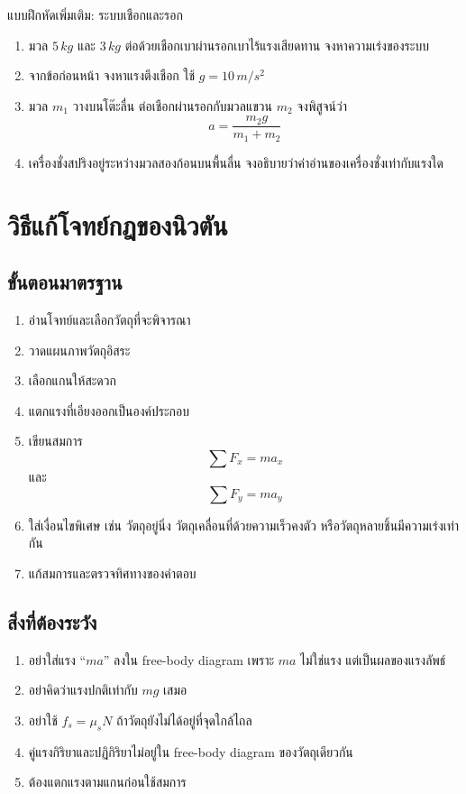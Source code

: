 \begin{exercisebox}{แบบฝึกหัดเพิ่มเติม: ระบบเชือกและรอก}
\begin{enumerate}
    \item มวล $5\,\si{kg}$ และ $3\,\si{kg}$ ต่อด้วยเชือกเบาผ่านรอกเบาไร้แรงเสียดทาน จงหาความเร่งของระบบ
    \item จากข้อก่อนหน้า จงหาแรงตึงเชือก ใช้ $g=10\,\si{m/s^2}$
    \item มวล $m_1$ วางบนโต๊ะลื่น ต่อเชือกผ่านรอกกับมวลแขวน $m_2$ จงพิสูจน์ว่า
    \[
    a=\frac{m_2g}{m_1+m_2}
    \]
    \item เครื่องชั่งสปริงอยู่ระหว่างมวลสองก้อนบนพื้นลื่น จงอธิบายว่าค่าอ่านของเครื่องชั่งเท่ากับแรงใด
\end{enumerate}
\end{exercisebox}

\section{วิธีแก้โจทย์กฎของนิวตัน}

\subsection{ขั้นตอนมาตรฐาน}

\begin{tcolorbox}[title=ขั้นตอนแก้โจทย์กฎของนิวตัน]
\begin{enumerate}
    \item อ่านโจทย์และเลือกวัตถุที่จะพิจารณา
    \item วาดแผนภาพวัตถุอิสระ
    \item เลือกแกนให้สะดวก
    \item แตกแรงที่เอียงออกเป็นองค์ประกอบ
    \item เขียนสมการ
    \[
    \sum F_x=ma_x
    \]
    และ
    \[
    \sum F_y=ma_y
    \]
    \item ใส่เงื่อนไขพิเศษ เช่น วัตถุอยู่นิ่ง วัตถุเคลื่อนที่ด้วยความเร็วคงตัว หรือวัตถุหลายชิ้นมีความเร่งเท่ากัน
    \item แก้สมการและตรวจทิศทางของคำตอบ
\end{enumerate}
\end{tcolorbox}

\subsection{สิ่งที่ต้องระวัง}

\begin{enumerate}
    \item อย่าใส่แรง ``$ma$'' ลงใน free-body diagram เพราะ $ma$ ไม่ใช่แรง แต่เป็นผลของแรงลัพธ์
    \item อย่าคิดว่าแรงปกติเท่ากับ $mg$ เสมอ
    \item อย่าใช้ $f_s=\mu_sN$ ถ้าวัตถุยังไม่ได้อยู่ที่จุดใกล้ไถล
    \item คู่แรงกิริยาและปฏิกิริยาไม่อยู่ใน free-body diagram ของวัตถุเดียวกัน
    \item ต้องแตกแรงตามแกนก่อนใช้สมการ
\end{enumerate}

